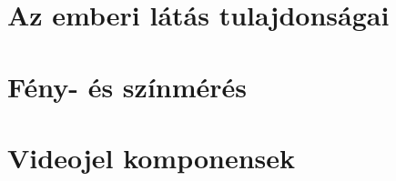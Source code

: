 \documentclass{book}
\begin{document}
\sloppy 


\titlepage
\chapter{Az emberi látás tulajdonságai}
\label{sec:HVS}
 

\chapter{Fény- és színmérés}
\label{sec:colorimetry}


\chapter{Videojel komponensek}
\label{sec:components}
 
\end{document}
